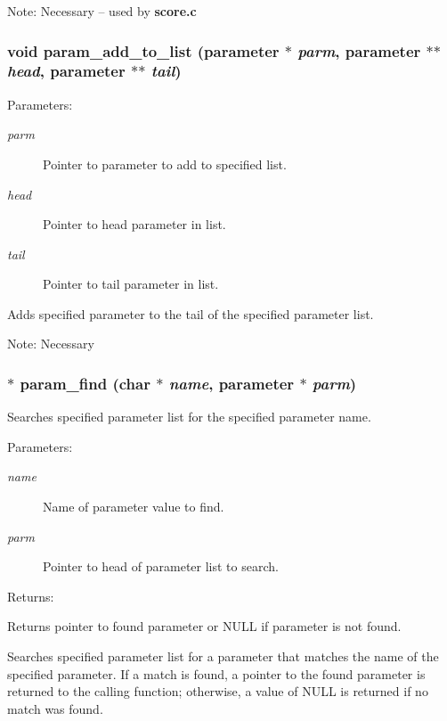 Note: Necessary -- used by {\bf score.c} 
\subsubsection{\setlength{\rightskip}{0pt plus 5cm}void param\_\-add\_\-to\_\-list ({\bf parameter} $\ast$ {\em parm}, {\bf parameter} $\ast$$\ast$ {\em head}, {\bf parameter} $\ast$$\ast$ {\em tail})}\label{param_8c_a4}


\begin{Desc}
\item[Parameters: ]\par
\begin{description}
\item[{\em 
parm}]Pointer to parameter to add to specified list. \item[{\em 
head}]Pointer to head parameter in list. \item[{\em 
tail}]Pointer to tail parameter in list.\end{description}
\end{Desc}
Adds specified parameter to the tail of the specified parameter list.

Note: Necessary 
\subsubsection{$\ast$ param\_\-find (char $\ast$ {\em name}, {\bf parameter} $\ast$ {\em parm})}\label{param_8c_a2}


Searches specified parameter list for the specified parameter name.

\begin{Desc}
\item[Parameters: ]\par
\begin{description}
\item[{\em 
name}]Name of parameter value to find. \item[{\em 
parm}]Pointer to head of parameter list to search.\end{description}
\end{Desc}
\begin{Desc}
\item[Returns: ]\par
Returns pointer to found parameter or NULL if parameter is not found.\end{Desc}
Searches specified parameter list for a parameter that matches the name of the specified parameter. If a match is found, a pointer to the found parameter is returned to the calling function; otherwise, a value of NULL is returned if no match was found.

